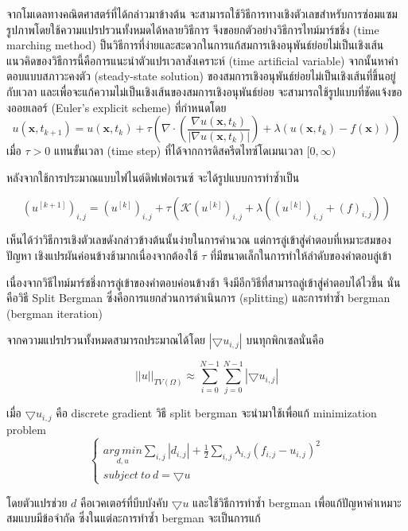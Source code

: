 \documentclass[hidelinks,a4paper,14pt]{article}
\numberwithin{equation}{section}							%
\begin{document}
{		จากโมเดลทางคณิตศาสตร์ที่ได้กล่าวมาข้างต้น จะสามารถใช้วิธีการทางเชิงตัวเลขสำหรับการซ่อมแซมรูปภาพโดยใช้ความแปรปรวนทั้งหมดได้หลายวิธีการ จึงขอยกตัวอย่างวิธีการไทม์มาร์ชชิ่ง (time marching method) \cite{ref:ExplicitTimeMarching}  ป็นวิธีการที่ง่ายและสะดวกในการแก้สมการเชิงอนุพันธ์ย่อยไม่เป็นเชิงเส้น
		แนวคิดของวิธีการนี้คือการแนะนําตัวแปรเวลาสังเคราะห์ (time artificial variable) จากนั้นหาคําตอบแบบสภาวะคงตัว (steady-state solution) ของสมการเชิงอนุพันธ์ย่อยไม่เป็นเชิงเส้นที่ขึ้นอยู่กับเวลา และเพื่อจะแก้ความไม่เป็นเชิงเส้นของสมการเชิงอนุพันธ์ย่อย จะสามารถใช้รูปแบบที่ชัดแจ้งของออยเลอร์ (Euler's explicit scheme) ที่กำหนดโดย
		$$
		u(\mathbf{x},t_{k+1})=u(\mathbf{x},t_{k})+\tau\left(\nabla\cdot\left(\frac{\nabla u ( \mathbf{x},t_k)}{\lvert \nabla u ( \mathbf{x},t_k) \rvert }\right) + \lambda(u ( \mathbf{x},t_k)-f(\mathbf{x})) \right)
		$$
		เมื่อ $\tau>0$ แทนขั้นเวลา (time step) ที่ได้จากการดิสครีตไทซ์โดเมนเวลา $[0,\infty)$
		
		หลังจากใช้การประมาณแบบไฟไนต์ดิฟเฟอเรนซ์ จะได้รูปแบบการทำซ้ำเป็น
		
		$$ (u^{[k+1]})_{i,j} = (u^{[k]})_{i,j}+\tau\left(  \mathcal{K}(u^{[k]})_{i,j}+\lambda((u^{[k]})_{i,j}+(f)_{i,j})\right) $$
		
		เห็นได้ว่าวิธีการเชิงตัวเลขดังกล่าวข้างต้นนั้นง่ายในการคํานวณ แต่การลู่เข้าสู่คําตอบที่เหมาะสมของปัญหา เชิงแปรผันค่อนข้างช้ามากเนื่องจากต้องใช้ $\tau$ ที่มีขนาดเล็กในการทำให้ลำดับของคำตอบลู่เข้า 
	
		เนื่องจากวิธีไทม์มาร์ชชิ่งการลู่เข้าของคำตอบค่อนข้างช้า จึงมีอีกวิธีที่สามารถลู่เข้าสู่คำตอบได้ไวขึ้น  นั่นคือวิธี Split Bergman \cite{ref:splitbergman-inpaint} ซึ่งคือการแยกส่วนการดำเนินการ (splitting) และการทำซ้ำ bergman (bergman iteration)
		
		จากความแปรปรวนทั้งหมดสามารถประมาณได้โดย $ |\bigtriangledown u_{i,j} | $ บนทุกพิกเซลนั่นคือ
		
		$$ ||u||_{TV(\Omega)} \approx \sum_{i=0}^{N-1} \sum_{j=0}^{N-1} |\bigtriangledown u_{i,j}| $$
		
		เมื่อ $\bigtriangledown u_{i,j}$  คือ discrete gradient วิธี split bergman  จะนำมาใช้เพื่อแก้ minimization problem 
		$$
		\left\{ \begin{array}{lc} 
		\underset{d , u}{arg \ min}\sum_{i,j}|d_{i,j}|+\frac{1}{2}\sum_{i,j}\lambda_{i,j}(f_{i,j} - u_{i,j})^2 \\
		subject \ to \ d = \bigtriangledown u 
		\end{array} \right .
		$$
		
		โดยตัวแปรช่วย $d$  คือเวคเตอร์ที่บีบบังคับ $ \bigtriangledown u$ และใช้วิธีการทำซ้ำ bergman เพื่อแก้ปัญหาค่าเหมาะสมแบบมีข้อจำกัด ซึ่งในแต่ละการทำซ้ำ bergman จะเป็นการแก้
		
}
\end{document}
